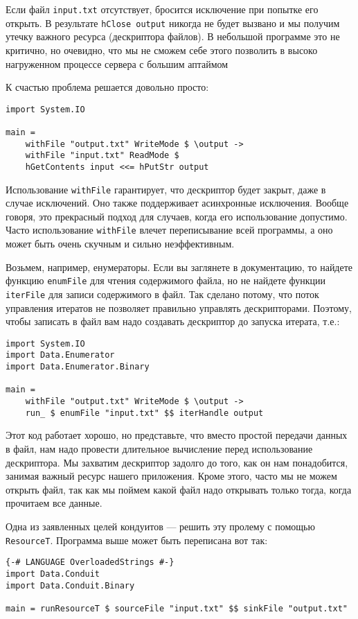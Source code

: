 Если файл \verb*|input.txt| отсутствует, бросится исключение при попытке его открыть. В
результате \lstinline'hClose output' никогда не будет вызвано и мы получим утечку важного
ресурса
(дескриптора файлов). В небольшой программе это не критично, но очевидно, что мы не
сможем себе этого позволить в высоко нагруженном процессе сервера с большим аптаймом

К счастью проблема решается довольно просто:
\begin{lstlisting}
import System.IO

main =
    withFile "output.txt" WriteMode $ \output ->
    withFile "input.txt" ReadMode $ 
    hGetContents input <<= hPutStr output
\end{lstlisting}

Использование \lstinline'withFile' гарантирует, что дескриптор будет закрыт, даже в
случае
исключений. Оно также поддерживает асинхронные исключения. Вообще говоря, это прекрасный
подход для случаев, когда его использование допустимо. Часто использование \lstinline'withFile' влечет переписывание всей программы, а оно может быть очень
скучным и сильно неэффективным.

Возьмем, например, енумераторы. Если вы заглянете в документацию, то найдете функцию
\lstinline'enumFile' для чтения содержимого файла, но не найдете функции
\lstinline'iterFile' для записи
содержимого в файл. Так сделано потому, что поток управления итератов не позволяет
правильно управлять дескрипторами. Поэтому, чтобы записать в файл вам надо создавать
дескриптор до запуска итерата, т.е.: 

\begin{lstlisting}
import System.IO
import Data.Enumerator
import Data.Enumerator.Binary

main =
    withFile "output.txt" WriteMode $ \output ->
    run_ $ enumFile "input.txt" $$ iterHandle output
\end{lstlisting}

Этот код работает хорошо, но представьте, что вместо простой передачи данных в файл, нам
надо провести длительное вычисление перед использование дескриптора. Мы захватим
дескриптор задолго до того, как он нам понадобится, занимая важный ресурс нашего
приложения. Кроме этого, часто мы не можем открыть файл, так как мы поймем какой файл
надо открывать только тогда, когда прочитаем все данные.

Одна из заявленных целей кондуитов --- решить эту пролему с помощью \lstinline'ResourceT'.
Программа выше может быть переписана вот так:
\begin{lstlisting}
{-# LANGUAGE OverloadedStrings #-}
import Data.Conduit
import Data.Conduit.Binary

main = runResourceT $ sourceFile "input.txt" $$ sinkFile "output.txt"
\end{lstlisting}

